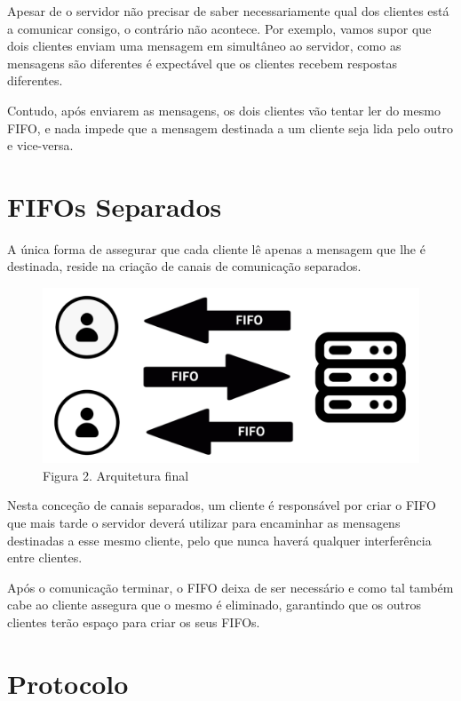 \documentclass[12pt,a4paper]{report}
\begin{document}
        Apesar de o servidor não precisar de saber necessariamente qual dos clientes está a comunicar consigo, o contrário não acontece. Por exemplo, vamos supor que dois clientes enviam uma mensagem em simultâneo ao servidor, como as mensagens são diferentes é expectável que os clientes recebem respostas diferentes.

        Contudo, após enviarem as mensagens, os dois clientes vão tentar ler do mesmo FIFO, e nada impede que a mensagem destinada a um cliente seja lida pelo outro e vice-versa. 


    \section{FIFOs Separados}

        A única forma de assegurar que cada cliente lê apenas a mensagem que lhe é destinada, reside na criação de canais de comunicação separados.

        \newpage

        \begin{figure}[hb!]
            \centering
            \includegraphics{images/arq2.png}
            \caption*{Figura 2. Arquitetura final}
            \label{fig:Arq2}
        \end{figure}

        Nesta conceção de canais separados, um cliente é responsável por criar o FIFO que mais tarde o servidor deverá utilizar para encaminhar as mensagens destinadas a esse mesmo cliente, pelo que nunca haverá qualquer interferência entre clientes.

        Após o comunicação terminar, o FIFO deixa de ser necessário e como tal também cabe ao cliente assegura que o mesmo é eliminado, garantindo que os outros clientes terão espaço para criar os seus FIFOs.


    \section{Protocolo}
\end{document}
